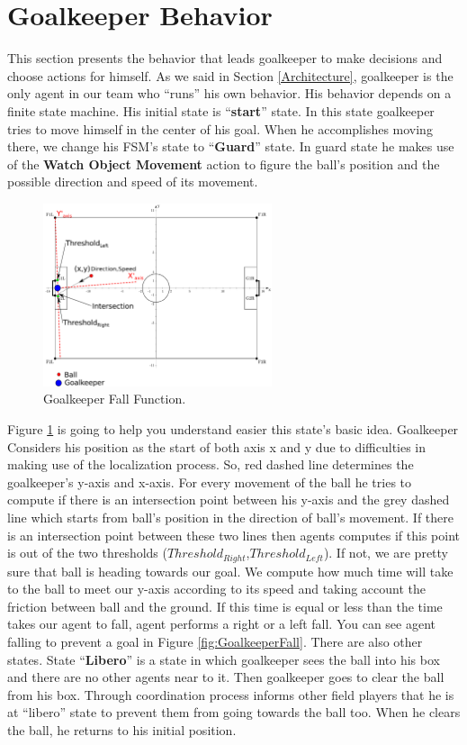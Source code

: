 \section{Goalkeeper Behavior}
This section presents the behavior that leads goalkeeper to make decisions and choose actions for himself. As we said in Section \ref{Architecture}, goalkeeper is the only agent in our team who ``runs'' his own behavior. His behavior depends on a finite state machine. His initial state is ``\textbf{start}'' state. In this state goalkeeper tries to move himself in the center of his goal. When he accomplishes moving there, we change his FSM's state to ``\textbf{Guard}'' state. In guard state he makes use of the \textbf{Watch Object Movement} action to figure the ball's position and the possible direction and speed of its movement.
\begin{figure}[!h]
\centering
  \includegraphics[trim = 0cm 0cm 10cm 0cm, clip,width=0.6\textwidth]{Chapter3/figures/Goalie.pdf}  
  \caption{Goalkeeper Fall Function.}
  \label{fig:Goalkeeper}
\end{figure} 
Figure \ref{fig:Goalkeeper} is going to help you understand easier this state's basic idea. Goalkeeper Considers his position as the start of both axis x and y due to difficulties in making use of the localization process. So, red dashed line determines the goalkeeper's y-axis and x-axis. For every movement of the ball he tries to compute if there is an intersection point between his y-axis and the grey dashed line which starts from ball's position in the direction of ball's movement. If there is an intersection point between these two lines then agents computes if this point is out of the two thresholds ($Threshold_{Right}$,$Threshold_{Left}$). If not, we are pretty sure that ball is heading towards our goal. We compute how much time will take to the ball to meet our y-axis according to its speed and taking account the friction between ball and the ground. If this time is equal or less than the time takes our agent to fall, agent performs a right or a left fall. You can see agent falling to prevent a goal in Figure \ref{fig:GoalkeeperFall}. There are also other states. State ``\textbf{Libero}'' is a state in which goalkeeper sees the ball into his box and there are no other agents near to it. Then goalkeeper goes to clear the ball from his box. Through coordination process informs other field players that he is at ``libero'' state to prevent them from going towards the ball too. When he clears the ball, he returns to his initial position. 

